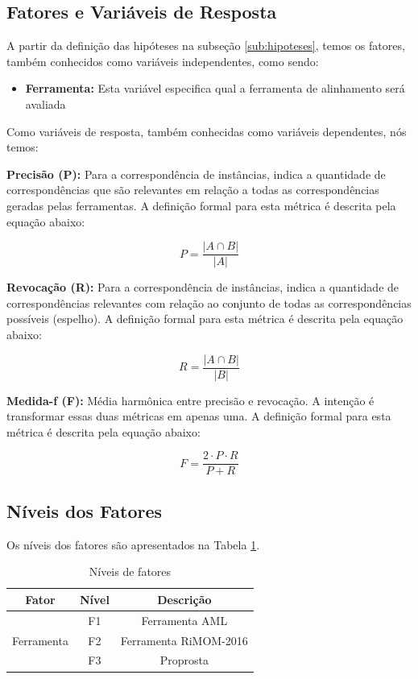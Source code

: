 \subsection{Fatores e Variáveis de Resposta}
A partir da definição das hipóteses na subseção \ref{sub:hipoteses}, temos os fatores, também conhecidos como variáveis independentes, como sendo:
\begin{itemize}
	\item \textbf{Ferramenta:} Esta variável especifica qual a ferramenta de alinhamento será avaliada
\end{itemize}

Como variáveis de resposta, também conhecidas como variáveis dependentes, nós temos:

\textbf{Precisão (P):} Para a correspondência de instâncias, indica a quantidade de correspondências que são relevantes em relação a todas as correspondências geradas pelas ferramentas. A definição formal para esta métrica é descrita pela equação abaixo:

\begin{equation}
P = \dfrac{|{A}\cap{B}|}{|A|}
\end{equation}

\textbf{Revocação (R):} Para a correspondência de instâncias, indica a quantidade de correspondências relevantes com relação ao conjunto de todas as correspondências possíveis (espelho). A definição formal para esta métrica é descrita pela equação abaixo:

\begin{equation}
R = \dfrac{|{A}\cap{B}|}{|B|}
\end{equation}

\textbf{Medida-f (F):} Média harmônica entre precisão e revocação. A intenção é transformar essas duas métricas em apenas uma. A definição formal para esta métrica é descrita pela equação abaixo:

\begin{equation}
F = \dfrac{{2}\cdot{P}\cdot{R}}{P+R}
\end{equation}

\subsection{Níveis dos Fatores}
\label{sub:fator_nivel}
Os níveis dos fatores são apresentados na Tabela \ref{tab:factor_levels}.

\begin{table}[h]
	\centering
	\caption{Níveis de fatores}
	\label{tab:factor_levels}
	\begin{tabular}{|c|c|c|}
		\hline
		\textbf{Fator}        & \textbf{Nível} &  \textbf{Descrição}   \\ \hline
		\multirow{3}{*}{Ferramenta} &       F1       &    Ferramenta AML     \\ \cline{2-3}
		&       F2       & Ferramenta RiMOM-2016 \\ \cline{2-3}
		&       F3       &       Proprosta       \\ \hline
	\end{tabular}
\end{table}

